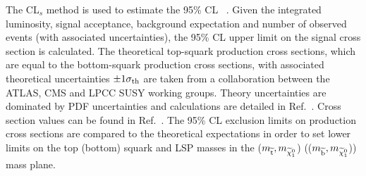 The CL$_{s}$ method is used to estimate the 95\% \ac{CL} ~\cite{bib:STAT_RooStats,PDG}.
Given the integrated luminosity, signal acceptance, background expectation and number of observed events (with associated uncertainties),
the 95\% \ac{CL} upper limit on the signal cross section is calculated. 
The theoretical top-squark production cross sections, which are equal to the bottom-squark production cross sections, with associated theoretical uncertainties $\pm1\sigma_{\rm th}$ are taken from a collaboration between the \ac{ATLAS}, \ac{CMS}
and \ac{LPCC} \ac{SUSY} working groups. 
Theory uncertainties are dominated by PDF uncertainties 
and calculations are detailed in Ref.~\cite{bib:SUSYxs}. 
Cross section values can be found in Ref.~\cite{stopsbottomxs}.  
The 95\% \ac{CL} exclusion limits on production cross sections are compared to the theoretical expectations in order to set lower limits on the top (bottom) squark and LSP masses in the ($m_{\widetilde{{\rm t}}}, m_{\widetilde{\chi}^{0}_{1}}$) (($m_{\widetilde{{\rm b}}}, m_{\widetilde{\chi}^{0}_{1}}$)) mass plane. 


